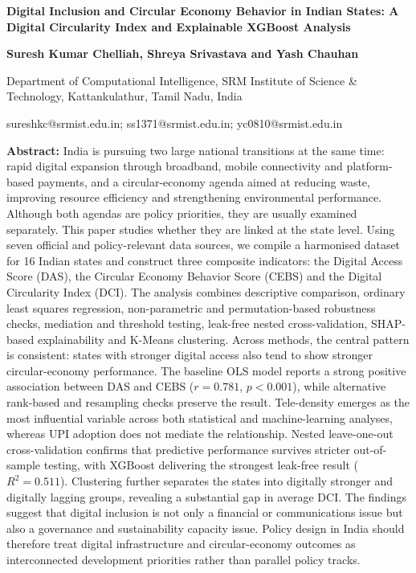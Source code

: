 \documentclass[10pt,a4paper]{article}
\begin{document}
\pagestyle{plain}

\begin{center}
{\fontsize{20}{24}\selectfont\bfseries Digital Inclusion and Circular Economy Behavior in Indian States: A Digital Circularity Index and Explainable XGBoost Analysis\par}
\vspace{0.6cm}
{\large\bfseries Suresh Kumar Chelliah, Shreya Srivastava and Yash Chauhan\par}
\vspace{0.15cm}
{\normalsize Department of Computational Intelligence, SRM Institute of Science \& Technology, Kattankulathur, Tamil Nadu, India\par}
{\normalsize sureshkc@srmist.edu.in; ss1371@srmist.edu.in; yc0810@srmist.edu.in\par}
\end{center}

\textbf{Abstract:} India is pursuing two large national transitions at the same time: rapid digital expansion through broadband, mobile connectivity and platform-based payments, and a circular-economy agenda aimed at reducing waste, improving resource efficiency and strengthening environmental performance. Although both agendas are policy priorities, they are usually examined separately. This paper studies whether they are linked at the state level. Using seven official and policy-relevant data sources, we compile a harmonised dataset for 16 Indian states and construct three composite indicators: the Digital Access Score (DAS), the Circular Economy Behavior Score (CEBS) and the Digital Circularity Index (DCI). The analysis combines descriptive comparison, ordinary least squares regression, non-parametric and permutation-based robustness checks, mediation and threshold testing, leak-free nested cross-validation, SHAP-based explainability and K-Means clustering. Across methods, the central pattern is consistent: states with stronger digital access also tend to show stronger circular-economy performance. The baseline OLS model reports a strong positive association between DAS and CEBS ($r=0.781$, $p<0.001$), while alternative rank-based and resampling checks preserve the result. Tele-density emerges as the most influential variable across both statistical and machine-learning analyses, whereas UPI adoption does not mediate the relationship. Nested leave-one-out cross-validation confirms that predictive performance survives stricter out-of-sample testing, with XGBoost delivering the strongest leak-free result ($R^2=0.511$). Clustering further separates the states into digitally stronger and digitally lagging groups, revealing a substantial gap in average DCI. The findings suggest that digital inclusion is not only a financial or communications issue but also a governance and sustainability capacity issue. Policy design in India should therefore treat digital infrastructure and circular-economy outcomes as interconnected development priorities rather than parallel policy tracks.
\end{document}

